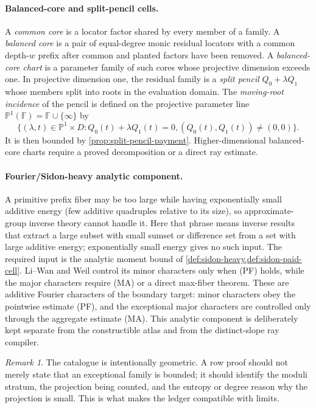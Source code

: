 \documentclass[12pt,a4paper]{amsart}
\numberwithin{equation}{section}
\theoremstyle{remark}
\newtheorem{remark}[remark]{Remark}
\newcommand{\F}{\mathbb F}
\newcommand{\Pj}{\mathbb P}
\begin{document}
\paragraph{Balanced-core and split-pencil cells.}
A \emph{common core} is a locator factor shared by every member of a
family.  A \emph{balanced core} is a pair of equal-degree monic residual
locators with a common depth-\(w\) prefix after common and planted factors
have been removed.  A \emph{balanced-core chart} is a parameter family of
such cores whose projective dimension exceeds one.  In projective
dimension one, the residual family is a \emph{split pencil}
\(Q_0+\lambda Q_1\) whose members split into roots in the evaluation
domain.  The \emph{moving-root incidence} of the pencil is
defined on the projective parameter line
\(\Pj^1(\F)=\F\cup\{\infty\}\) by
\[
 \{(\lambda,t)\in\Pj^1\times D:
        Q_0(t)+\lambda Q_1(t)=0,
        (Q_0(t),Q_1(t))\ne(0,0)\}.
\]
It is then bounded by
\cref{prop:split-pencil-payment}.  Higher-dimensional balanced-core charts
require a proved decomposition or a direct ray estimate.

\paragraph{Fourier/Sidon-heavy analytic component.}
A primitive prefix fiber may be too large while having exponentially small
additive energy (few additive quadruples relative to its size), so
approximate-group inverse theory cannot handle it.  Here that phrase means
inverse results that extract a large subset with small sumset or difference
set from a set with large additive energy; exponentially small energy gives
no such input.
The required input is the analytic moment bound of
\cref{def:sidon-heavy,def:sidon-paid-cell}.  Li--Wan and Weil control its
minor characters only when \textup{(PF)} holds, while the major characters
require \textup{(MA)} or a direct max-fiber theorem.  These are additive
Fourier characters of the boundary target: minor characters obey the
pointwise estimate \textup{(PF)}, and the exceptional major characters are
controlled only through the aggregate estimate \textup{(MA)}.  This analytic
component is deliberately kept separate from the constructible atlas and
from the distinct-slope ray compiler.

\begin{remark}
The catalogue is intentionally geometric.  A row proof should not merely state that an exceptional family is bounded; it should identify the moduli stratum, the projection being counted, and the entropy or degree reason why the projection is small.  This is what makes the ledger compatible with limits.
\end{remark}
\end{document}
